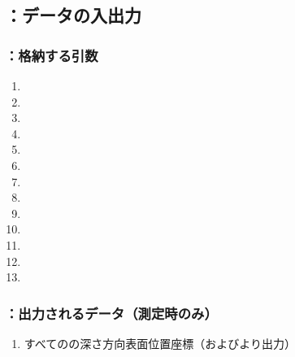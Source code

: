\subsection{\DLone：データの入出力}

\subsubsection{\DLone：格納する引数}
\begin{enumerate}[label*=\sarrow]
\item \PMAlocationAngle
\item \PMDimpleAngle
\item \PMDimpleHorizontalPitch
\item \PMDimpleVerticalPitch
\item \PMDimpleOddRowLength
\item \PMDimpleEvenRowLength
\item \PMDimpleRowNum
\item \PMDistanceTopEndFaceDimpleFirstRow
\item \PMDimpleDepth
\item \PMPlatingThk
\item \PMCenterCurvatureRadius
\item \PMTopAlocationLength
\item \PMTopReAlocationLength
\end{enumerate}

\subsubsection{\DLone：出力されるデータ（測定時のみ）}
\begin{enumerate}[label*=\sarrow]
\item すべての\Dimple の深さ方向表面位置座標（\DMLthreeAC および\DMLthreeBD より出力）
\end{enumerate}

\clearpage
